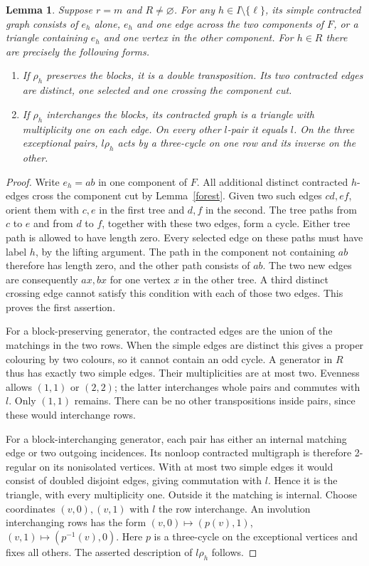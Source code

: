 \documentclass[11pt,a4paper]{article}
\newtheorem{lemma}{Lemma}
\begin{document}
\begin{lemma}\label{local}
Suppose $r=m$ and $R\ne\varnothing$. For any
$h\in I\setminus\{\ell\}$, its simple contracted graph consists
of $e_h$ alone, $e_h$ and one edge across the two components of
$F$, or a triangle containing $e_h$ and one vertex in the other
component. For $h\in R$ there are precisely the following forms.
\begin{enumerate}
\item If $\rho_h$ preserves the blocks, it is a double
transposition. Its two contracted edges are distinct, one selected
and one crossing the component cut.
\item If $\rho_h$ interchanges the blocks, its contracted graph
is a triangle with multiplicity one on each edge. On every other
$l$-pair it equals $l$. On the three exceptional pairs, $l\rho_h$
acts by a three-cycle on one row and its inverse on the other.
\end{enumerate}
\end{lemma}
\begin{proof}
Write $e_h=ab$ in one component of $F$. All additional distinct
contracted $h$-edges cross the component cut by Lemma~\ref{forest}.
Given two such edges $cd,ef$, orient them with $c,e$ in the first
tree and $d,f$ in the second. The tree paths from $c$ to $e$ and
from $d$ to $f$, together with these two edges, form a cycle.
Either tree path is allowed to have length zero. Every selected
edge on these paths must have label $h$, by the lifting argument.
The path in the component not containing $ab$ therefore has
length zero, and the other path consists of $ab$. The two new
edges are consequently $ax,bx$ for one vertex $x$ in the other
tree. A third distinct crossing edge cannot satisfy this condition
with each of those two edges. This proves the first assertion.

For a block-preserving generator, the contracted edges are the
union of the matchings in the two rows. When the simple edges are
distinct this gives a proper colouring by two colours, so it
cannot contain an odd cycle. A generator in $R$ thus has exactly
two simple edges. Their multiplicities are at most two. Evenness
allows $(1,1)$ or $(2,2)$; the latter interchanges whole pairs and
commutes with $l$. Only $(1,1)$ remains. There can be no other
transpositions inside pairs, since these would interchange rows.

For a block-interchanging generator, each pair has either an
internal matching edge or two outgoing incidences. Its nonloop
contracted multigraph is therefore 2-regular on its nonisolated
vertices. With at most two simple edges it would consist of
doubled disjoint edges, giving commutation with $l$. Hence it is
the triangle, with every multiplicity one. Outside it the matching
is internal. Choose coordinates $(v,0),(v,1)$ with $l$ the row
interchange. An involution interchanging rows has the form
$(v,0)\mapsto(p(v),1)$, $(v,1)\mapsto(p^{-1}(v),0)$.
Here $p$ is a three-cycle on the exceptional vertices and fixes
all others. The asserted description of $l\rho_h$ follows.
\end{proof}
\end{document}
